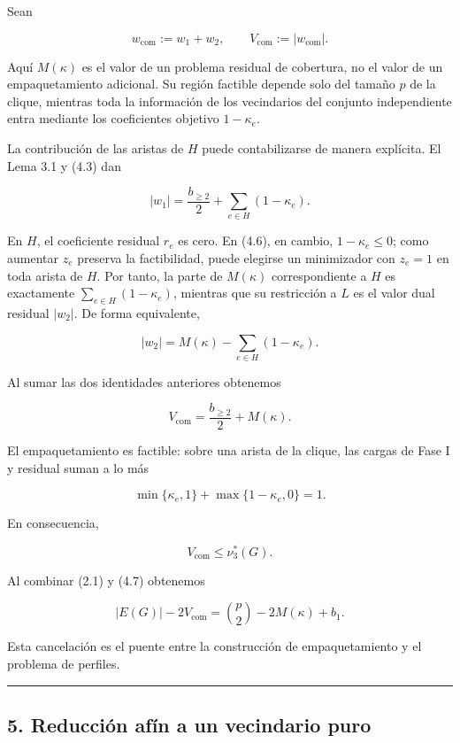 \documentclass[spanish,11pt,a4paper]{article}
\begin{document}
Sean

\[
w_{\mathrm{com}}:=w_1+w_2,
\qquad
V_{\mathrm{com}}:=|w_{\mathrm{com}}|.
\]

Aquí \(M(\kappa)\) es el valor de un problema residual de cobertura, no
el valor de un empaquetamiento adicional. Su región factible depende
solo del tamaño \(p\) de la clique, mientras toda la información de los
vecindarios del conjunto independiente entra mediante los coeficientes
objetivo \(1-\kappa_e\).

La contribución de las aristas de \(H\) puede contabilizarse de manera
explícita. El Lema 3.1 y (4.3) dan

\[
|w_1|
=
\frac{b_{\ge2}}2+\sum_{e\in H}(1-\kappa_e).
\]

En \(H\), el coeficiente residual \(r_e\) es cero. En (4.6), en cambio,
\(1-\kappa_e\le0\); como aumentar \(z_e\) preserva la factibilidad,
puede elegirse un minimizador con \(z_e=1\) en toda arista de \(H\). Por
tanto, la parte de \(M(\kappa)\) correspondiente a \(H\) es exactamente
\(\sum_{e\in H}(1-\kappa_e)\), mientras que su restricción a \(L\) es el
valor dual residual \(|w_2|\). De forma equivalente,

\[
|w_2|=M(\kappa)-\sum_{e\in H}(1-\kappa_e).
\]

Al sumar las dos identidades anteriores obtenemos

\[
\boxed{
V_{\mathrm{com}}
=
\frac{b_{\ge2}}2+M(\kappa)
}.
\tag{4.7}
\]

El empaquetamiento es factible: sobre una arista de la clique, las
cargas de Fase I y residual suman a lo más

\[
\min\{\kappa_e,1\}
+
\max\{1-\kappa_e,0\}
=
1.
\]

En consecuencia,

\[
V_{\mathrm{com}}\le\nu_3^*(G).
\tag{4.8}
\]

Al combinar (2.1) y (4.7) obtenemos

\[
\boxed{
|E(G)|-2V_{\mathrm{com}}
=
\binom{p}{2}-2M(\kappa)+b_1
}.
\tag{4.9}
\]

Esta cancelación es el puente entre la construcción de empaquetamiento y
el problema de perfiles.

\begin{center}\rule{0.5\linewidth}{0.5pt}\end{center}

\subsection{5. Reducción afín a un vecindario
puro}\label{reducciuxf3n-afuxedn-a-un-vecindario-puro}
\end{document}
